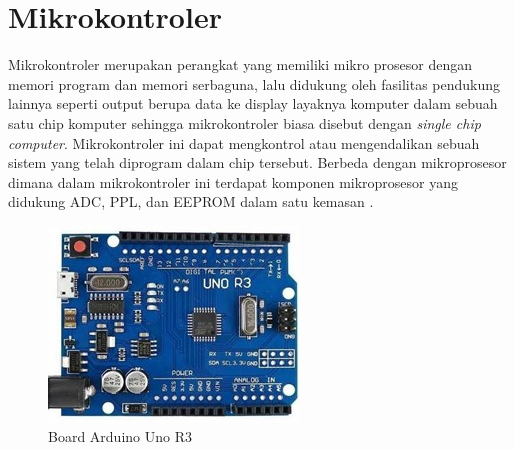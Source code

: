\section{Mikrokontroler}
Mikrokontroler merupakan perangkat yang memiliki mikro prosesor dengan memori program dan memori
serbaguna, lalu didukung oleh fasilitas pendukung lainnya seperti output berupa data ke display
layaknya komputer dalam sebuah satu chip komputer sehingga mikrokontroler biasa disebut dengan
\textit{single chip computer}. Mikrokontroler ini dapat mengkontrol atau mengendalikan sebuah sistem
yang telah diprogram dalam chip tersebut. Berbeda dengan mikroprosesor dimana dalam mikrokontroler
ini terdapat komponen mikroprosesor yang didukung ADC, PPL, dan EEPROM dalam satu kemasan
\cite{Sokop2016}.

\begin{figure}[H]
    \centering
    \includegraphics{Images/ArduinoUno.jpg}
    \caption{Board Arduino Uno R3}
    \label{fig:arduino}
\end{figure}

